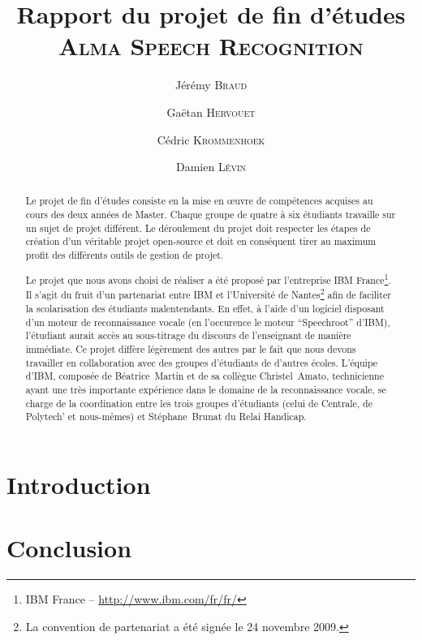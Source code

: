 \documentclass[a4paper,11pt]{report}
\title{Rapport du projet de fin d'études\\
	\huge{\textsc{Alma Speech Recognition}}}
\author{Jérémy \textsc{Braud} \and Gaëtan \textsc{Hervouet} \and Cédric \textsc{Krommenhoek} \and Damien \textsc{Lévin}}
\begin{document}
\maketitle

\begin{abstract}
Le projet de fin d'études consiste en la mise en \oe{}uvre de compétences acquises au cours des deux années de Master.
Chaque groupe de quatre à six étudiants travaille sur un sujet de projet différent.
Le déroulement du projet doit respecter les étapes de création d'un véritable projet open-source et doit en conséquent tirer au maximum profit des différents outils de gestion de projet.

Le projet que nous avons choisi de réaliser a été proposé par l'entreprise IBM France\footnote{IBM France -- \url{http://www.ibm.com/fr/fr/}}.
Il s'agit du fruit d'un partenariat entre IBM et l'Université de Nantes\footnote{La convention de partenariat a été signée le 24 novembre 2009.} afin de faciliter la scolarisation des étudiants malentendants.
En effet, à l'aide d'un logiciel disposant d'un moteur de reconnaissance vocale (en l'occurence le moteur ``Speechroot'' d'IBM), l'étudiant aurait accès au sous-titrage du discours de l'enseignant de manière immédiate.
Ce projet diffère légèrement des autres par le fait que nous devons travailler en collaboration avec des groupes d'étudiants de d'autres écoles.
L'équipe d'IBM, composée de Béatrice~Martin et de sa collègue Christel~Amato, technicienne ayant une très importante expérience dans le domaine de la reconnaissance vocale, se charge de la coordination entre les trois groupes d'étudiants (celui de Centrale, de Polytech' et nous-mêmes) et Stéphane~Brunat du Relai Handicap.
\end{abstract}

\tableofcontents

\chapter*{Introduction}






\chapter*{Conclusion}




\end{document}
